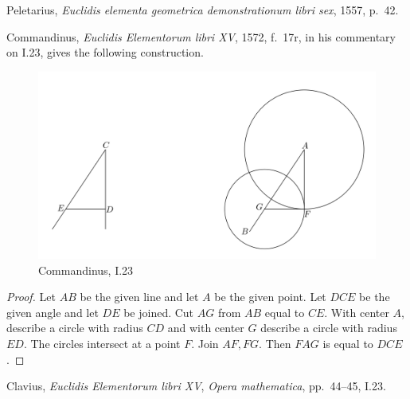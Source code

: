 \documentclass{article}
\begin{document}
Peletarius, {\em Euclidis elementa geometrica demonstrationum libri sex}, 1557, p.~42.

Commandinus, {\em Euclidis Elementorum libri XV}, 1572, f.~17r, in his commentary on I.23, gives the following
construction.

\begin{figure}
\begin{center}
\includegraphics[width=\textwidth]{commandinusI23.png}
\end{center}
\caption{Commandinus, I.23}
\label{commandinusI23}
\end{figure}

\begin{proof}
Let $AB$ be the given line and let $A$ be the given point. 
Let $DCE$ be the given angle and let $DE$ be joined.
Cut $AG$ from $AB$ equal to $CE$. 
With center $A$, describe a circle with radius $CD$ and with center $G$ describe a circle
with radius $ED$.
The circles intersect at a point $F$. Join $AF,FG$. Then
$FAG$ is equal to $DCE$. 
\end{proof}


Clavius, {\em Euclidis Elementorum libri XV}, {\em Opera mathematica}, pp.~44--45, 
I.23.
\end{document}
